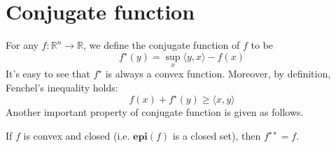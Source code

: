 \section{Conjugate function}
For any $f:\mathbb R^n\rightarrow \mathbb R$, we define the conjugate function of $f$ to be
\begin{equation}
f^\star(y)=\sup_x \langle y, x\rangle- f(x)
\end{equation}
It's easy to see that $f^\star$ is always a convex function. Moreover, by definition, Fenchel’s inequality holds:
\begin{equation}
f(x)+f^\star(y) \geq \langle x, y\rangle
\end{equation}
Another important property of conjugate function is given as follows.
\begin{proposition}
If $f$ is convex and closed (i.e. $\textbf{epi} (f)$ is a closed set), then $f^{\star\star}=f$.
\end{proposition}








